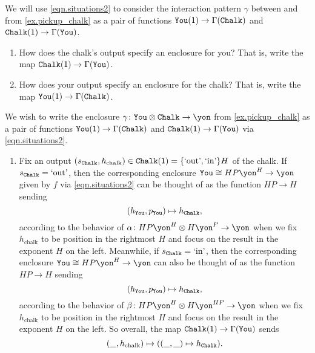 \documentclass[Book-Poly]{subfiles}
\begin{document}
\begin{exercise}
We will use \eqref{eqn.situations2} to consider the interaction pattern $\gamma$ between  and  from \cref{ex.pickup_chalk} as a pair of functions $\texttt{You}(\textsf{1})\to\Gamma(\texttt{Chalk})$ and $\texttt{Chalk}(\textsf{1})\to\Gamma(\texttt{You})$.
\begin{enumerate}
	\item How does the chalk's output specify an enclosure for you? That is, write the map $\texttt{Chalk}(\textsf{1})\to\Gamma(\texttt{You})$.
	\item How does your output specify an enclosure for the chalk? That is, write the map $\texttt{You}(\textsf{1})\to\Gamma(\texttt{Chalk})$.
\qedhere
\end{enumerate}
\begin{solution}
We wish to write the enclosure $\gamma\colon\const{You}\otimes\const{Chalk}\to\yon$ from \cref{ex.pickup_chalk} as a pair of functions $\texttt{You}(\textsf{1})\to\Gamma(\texttt{Chalk})$ and $\texttt{Chalk}(\textsf{1})\to\Gamma(\texttt{You})$ via \eqref{eqn.situations2}.
\begin{enumerate}
    \item Fix an output $(s_{\texttt{Chalk}}, h_\text{chalk})\in\texttt{Chalk}(\textsf{1})=\{\text{`out'},\text{`in'}\}H$ of the chalk.
    If $s_{\texttt{Chalk}}=\text{`out'}$, then the corresponding enclosure $\const{You}\iso HP\yon^H\to\yon$ given by $f$ via \eqref{eqn.situations2} can be thought of as the function $HP\to H$ sending
    \[
        (h_{\texttt{You}},p_{\texttt{You}})\mapsto h_{\texttt{Chalk}},
    \]
    according to the behavior of $\alpha\colon HP\yon^H\otimes H\yon^P\to\yon$ when we fix $h_\text{chalk}$ to be position in the rightmost $H$ and focus on the result in the exponent $H$ on the left.
    Meanwhile, if $s_{\texttt{Chalk}}=\text{`in'}$, then the corresponding enclosure $\const{You}\iso HP\yon^H\to\yon$ can also be thought of as the function $HP\to H$ sending
    \[
        (h_{\texttt{You}},p_{\texttt{You}})\mapsto h_{\texttt{Chalk}},
    \]
    according to the behavior of $\beta\colon HP\yon^H\otimes H\yon^{HP}\to\yon$ when we fix $h_\text{chalk}$ to be position in the rightmost $H$ and focus on the result in the exponent $H$ on the left.
    So overall, the map $\texttt{Chalk}(\textsf{1})\to\Gamma(\texttt{You})$ sends
    \[
        (\_,h_\text{chalk})\mapsto((\_,\_)\mapsto h_{\texttt{Chalk}}).
    \]


\end{enumerate}
\end{solution}
\end{exercise}
\end{document}
